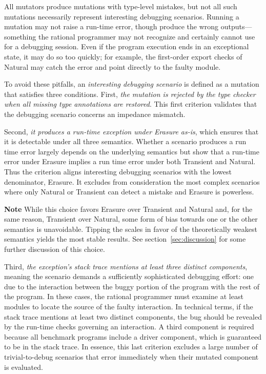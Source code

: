 All mutators produce mutations with type-level mistakes, but not all such
mutations necessarily represent interesting debugging scenarios. Running a
mutation may not raise a run-time error, though produce the wrong
outputs---something the rational programmer may not recognize and certainly
cannot use for a debugging session. Even if the program execution ends in an
exceptional state, it may do so too quickly; for example, the first-order export
checks of Natural may catch the error and point directly to the faulty module.

To avoid these pitfalls, an \emph{interesting debugging scenario} is
defined as a mutation that satisfies three conditions.  First, {\em
the mutation is rejected by the type checker when all missing type
annotations are restored\/}. This first criterion validates that the
debugging scenario concerns an impedance mismatch.

Second, {\em it produces a run-time exception under Erasure as-is\/}, which
ensures that it is detectable under all three semantics.  Whether a scenario
produces a run time error largely depends on the underlying semantics but
\citet{gfd-oopsla-2019} show that a run-time error under Erasure implies a run
time error under both Transient and Natural. Thus the criterion aligns
interesting debugging scenarios with the lowest denominator, Erasure. It
excludes from consideration the most complex scenarios where only Natural or
Transient can detect a mistake and Erasure is powerless.

{\bf Note} While this choice favors Erasure over Transient and Natural and, for
the same reason, Transient over Natural, some form of bias towards one or the
other semantics is unavoidable. Tipping the scales in favor of the theoretically
weakest semantics yields the most stable results. See
section~\ref{sec:discussion} for some further discussion of this choice.

Third, {\em the exception's stack trace mentions at least three
distinct components\/}, meaning the scenario demands a sufficiently
sophisticated debugging effort: one due to the interaction between the
buggy portion of the program with the rest of the program.  In these
cases, the rational programmer must examine at least modules to locate
the source of the faulty interaction.  In technical terms, if the
stack trace mentions at least two distinct components, the bug should
be revealed by the run-time checks governing an interaction. A third
component is required because all benchmark programs include a driver
component, which is guaranteed to be in the stack trace. In essence,
this last criterion excludes a large number of trivial-to-debug
scenarios that error immediately when their mutated component is
evaluated.

